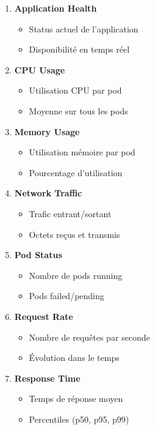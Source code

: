 \documentclass[12pt,a4paper]{article}
\begin{document}
\begin{enumerate}
    \item \textbf{Application Health}
    \begin{itemize}
        \item Status actuel de l'application
        \item Disponibilité en temps réel
    \end{itemize}
    
    \item \textbf{CPU Usage}
    \begin{itemize}
        \item Utilisation CPU par pod
        \item Moyenne sur tous les pods
    \end{itemize}
    
    \item \textbf{Memory Usage}
    \begin{itemize}
        \item Utilisation mémoire par pod
        \item Pourcentage d'utilisation
    \end{itemize}
    
    \item \textbf{Network Traffic}
    \begin{itemize}
        \item Trafic entrant/sortant
        \item Octets reçus et transmis
    \end{itemize}
    
    \item \textbf{Pod Status}
    \begin{itemize}
        \item Nombre de pods running
        \item Pods failed/pending
    \end{itemize}
    
    \item \textbf{Request Rate}
    \begin{itemize}
        \item Nombre de requêtes par seconde
        \item Évolution dans le temps
    \end{itemize}
    
    \item \textbf{Response Time}
    \begin{itemize}
        \item Temps de réponse moyen
        \item Percentiles (p50, p95, p99)
    \end{itemize}
    

\end{enumerate}
\end{document}

